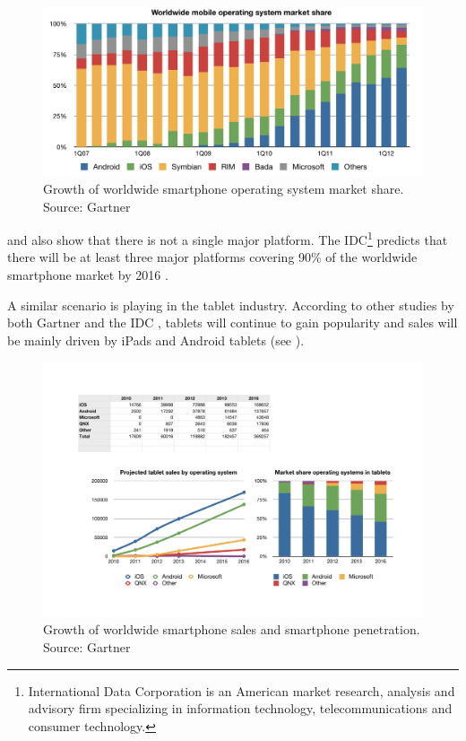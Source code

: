 \begin{figure}[h!]
    \begin{center}
        \includegraphics[width=\textwidth]{figs/smartphone_os.pdf}
        \caption{
            Growth of worldwide smartphone operating system market share.\newline 
            Source: Gartner \citeGartner
        	}
        \label{fig:smartphone-os}
    \end{center}
\end{figure}

 and  also show that there is not a single major platform. The IDC\footnote{International Data Corporation is an American market research, analysis and advisory firm specializing in information technology, telecommunications and consumer technology.} predicts that there will be at least three major platforms covering 90\% of the worldwide smartphone market by 2016 \cite{IDC:phone}.

A similar scenario is playing in the tablet industry. According to other studies by both Gartner \citep{Gartner:11tab,Gartner:12tab} and the IDC \citep{IDC:tablet}, tablets will continue to gain popularity and sales will be mainly driven by iPads and Android tablets (see ).

\begin{figure}[h!]
    \begin{center}
        \includegraphics[width=\textwidth]{figs/tablet.pdf}
        \caption{
            Growth of worldwide smartphone sales and smartphone penetration.\newline
            Source: Gartner \citeGartnerTab
        }
        \label{fig:tablet}
    \end{center}
\end{figure}

